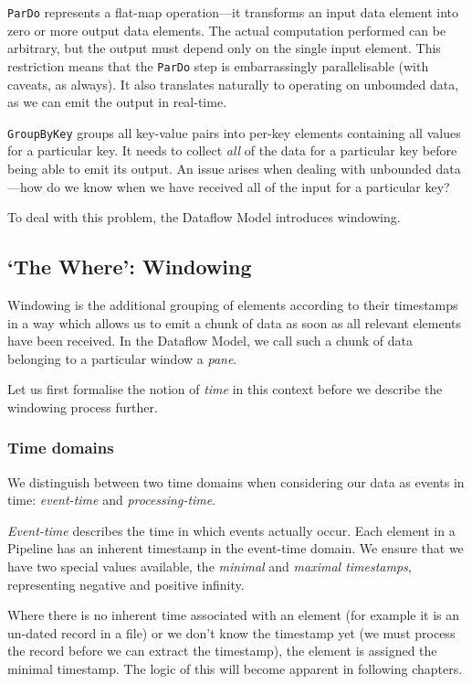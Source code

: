 \verb|ParDo| represents a flat-map operation---it transforms an input data element into zero or more output data elements.
The actual computation performed can be arbitrary, but the output must depend only on the single input element.
This restriction means that the \verb|ParDo| step is embarrassingly parallelisable (with caveats, as always).
It also translates naturally to operating on unbounded data, as we can emit the output in real-time.

\verb|GroupByKey| groups all key-value pairs into per-key elements containing all values for a particular key.
It needs to collect \emph{all} of the data for a particular key before being able to emit its output.
An issue arises when dealing with unbounded data---how do we know when we have received all of the input for a particular key?

To deal with this problem, the Dataflow Model introduces windowing.

\subsection{`The Where': Windowing}\label{sec:prep:dataflow:where}

Windowing is the additional grouping of elements according to their timestamps in a way which allows us to emit a chunk of data as soon as all relevant elements have been received.
In the Dataflow Model, we call such a chunk of data belonging to a particular window a \emph{pane}.

Let us first formalise the notion of \emph{time} in this context before we describe the windowing process further.

\subsubsection{Time domains}


We distinguish between two time domains when considering our data as events in time: \emph{event-time} and \emph{processing-time}.

\emph{Event-time} describes the time in which events actually occur.
Each element in a Pipeline has an inherent timestamp in the event-time domain.
We ensure that we have two special values available, the \emph{minimal} and \emph{maximal timestamps}, representing negative and positive infinity.

Where there is no inherent time associated with an element (for example it is an un-dated record in a file) or we don't know the timestamp yet (we must process the record before we can extract the timestamp), the element is assigned the minimal timestamp.
The logic of this will become apparent in following chapters.

